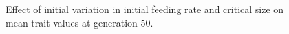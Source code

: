 \begin{figure}[p]
  \caption{Effect of initial variation in initial feeding rate and critical size on mean trait values at generation 50.}
  \label{fig:ivar_fr_mc}
\end{figure}

